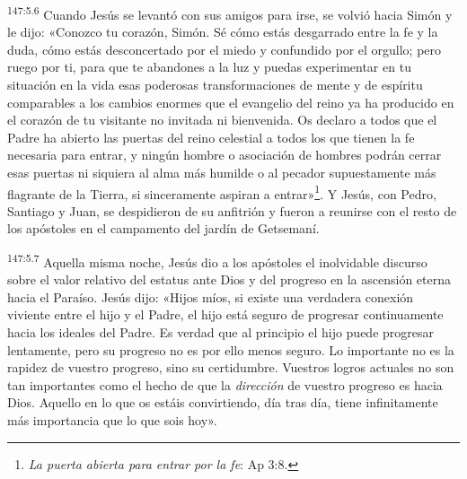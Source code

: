 \par
\textsuperscript{147:5.6} Cuando Jesús se levantó con sus amigos para irse, se volvió hacia Simón y le dijo: «Conozco tu corazón, Simón. Sé cómo estás desgarrado entre la fe y la duda, cómo estás desconcertado por el miedo y confundido por el orgullo; pero ruego por ti, para que te abandones a la luz y puedas experimentar en tu situación en la vida esas poderosas transformaciones de mente y de espíritu comparables a los cambios enormes que el evangelio del reino ya ha producido en el corazón de tu visitante no invitada ni bienvenida. Os declaro a todos que el Padre ha abierto las puertas del reino celestial a todos los que tienen la fe necesaria para entrar, y ningún hombre o asociación de hombres podrán cerrar esas puertas ni siquiera al alma más humilde o al pecador supuestamente más flagrante de la Tierra, si sinceramente aspiran a entrar»\footnote{\textit{La puerta abierta para entrar por la fe}: Ap 3:8.}. Y Jesús, con Pedro, Santiago y Juan, se despidieron de su anfitrión y fueron a reunirse con el resto de los apóstoles en el campamento del jardín de Getsemaní.

\par
\textsuperscript{147:5.7} Aquella misma noche, Jesús dio a los apóstoles el inolvidable discurso sobre el valor relativo del estatus ante Dios y del progreso en la ascensión eterna hacia el Paraíso. Jesús dijo: «Hijos míos, si existe una verdadera conexión viviente entre el hijo y el Padre, el hijo está seguro de progresar continuamente hacia los ideales del Padre. Es verdad que al principio el hijo puede progresar lentamente, pero su progreso no es por ello menos seguro. Lo importante no es la rapidez de vuestro progreso, sino su certidumbre. Vuestros logros actuales no son tan importantes como el hecho de que la \textit{dirección} de vuestro progreso es hacia Dios. Aquello en lo que os estáis convirtiendo, día tras día, tiene infinitamente más importancia que lo que sois hoy».

